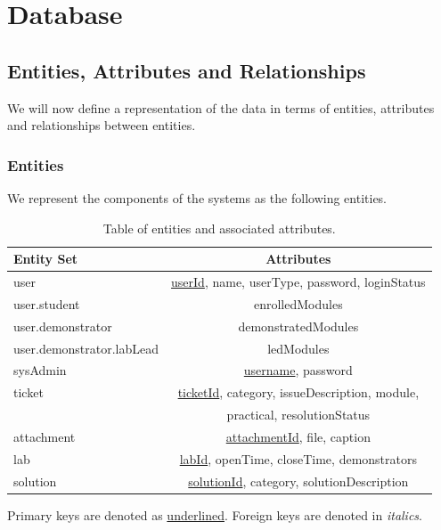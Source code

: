 \section{Database}

\subsection{Entities, Attributes and Relationships}
We will now define a representation of the data in terms of entities, attributes and relationships between entities.

\subsubsection{Entities}

We represent the components of the systems as the following entities. 

\FloatBarrier
\begin{table}[H]
\centering
\begin{tabular}{ |l|c| } 
 \hline
 \textbf{Entity Set} & \textbf{Attributes}\\ 
 \hline
  user & \underline{userId}, name, userType, password, loginStatus\\ 
 \hspace{6pt}user.student & enrolledModules\\ 
 \hspace{6pt}user.demonstrator & demonstratedModules\\
 \hspace{12pt}user.demonstrator.labLead & ledModules\\
 sysAdmin & \underline{username}, password\\ 
 ticket & \underline{ticketId}, category, issueDescription, module,\\
 & practical, resolutionStatus \\
 attachment & \underline{attachmentId}, file, caption \\
 lab & \underline{labId}, openTime, closeTime, demonstrators\\
 solution & \underline{solutionId}, category, solutionDescription\\
 \hline
\end{tabular}
\caption{Table of entities and associated attributes.}
\end{table}
\FloatBarrier

Primary keys are denoted as \underline{underlined}. Foreign keys are denoted in \textit{italics}.

